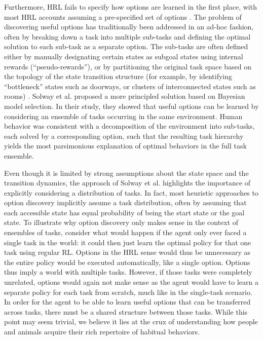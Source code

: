 \documentclass[11pt]{article}
\begin{document}
Furthermore, HRL fails to specify how options are learned in the first place, with most HRL accounts assuming a pre-specified set of options \cite{Botvinick2008}. The problem of discovering useful options has traditionally been addressed in an ad-hoc fashion, often by breaking down a task into multiple sub-tasks and defining the optimal solution to each sub-task as a separate option. The sub-tasks are often defined either by manually designating certain states as subgoal states using internal rewards (``pseudo-rewards''), or by partitioning the original task space based on the topology of the state transition structure (for example, by identifying ``bottleneck'' states such as doorways, or clusters of interconnected states such as rooms) \cite{Botvinick2008}. Solway et al. \cite{Solway2014} proposed a more principled solution based on Bayesian model selection. In their study, they showed that useful options can be learned by considering an ensemble of tasks occurring in the same environment. Human behavior was consistent with a decomposition of the environment into sub-tasks, each solved by a corresponding option, such that the resulting task hierarchy yields the most parsimonious explanation of optimal behaviors in the full task ensemble.

Even though it is limited by strong assumptions about the state space and the transition dynamics, the approach of Solway et al. highlights the importance of explicitly considering a distribution of tasks. In fact, most heuristic approaches to option discovery implicitly assume a task distribution, often by assuming that each accessible state has equal probability of being the start state or the goal state. To illustrate why option discovery only makes sense in the context of ensembles of tasks, consider what would happen if the agent only ever faced a single task in the world: it could then just learn the optimal policy for that one task using regular RL. Options in the HRL sense would thus be unnecessary as the entire policy would be executed automatically, like a single option. Options thus imply a world with multiple tasks. However, if those tasks were completely unrelated, options would again not make sense as the agent would have to learn a separate policy for each task from scratch, much like in the single-task scenario. In order for the agent to be able to learn useful options that can be transferred across tasks, there must be a shared structure between those tasks. While this point may seem trivial, we believe it lies at the crux of understanding how people and animals acquire their rich repertoire of habitual behaviors.
\end{document}
